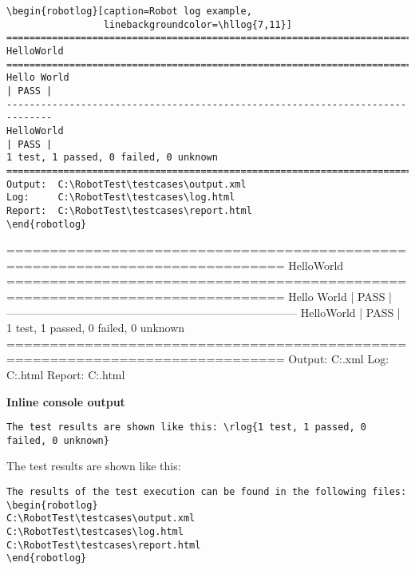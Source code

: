 \documentclass[a4paper,10pt]{report}
\begin{document}
\begin{verbatim}
\begin{robotlog}[caption=Robot log example, 
                 linebackgroundcolor=\hllog{7,11}]
==============================================================================
HelloWorld
==============================================================================
Hello World                                                           | PASS |
------------------------------------------------------------------------------
HelloWorld                                                            | PASS |
1 test, 1 passed, 0 failed, 0 unknown
==============================================================================
Output:  C:\RobotTest\testcases\output.xml
Log:     C:\RobotTest\testcases\log.html
Report:  C:\RobotTest\testcases\report.html
\end{robotlog}
\end{verbatim}

\begin{robotlog}[caption=Robot log example, 
                 linebackgroundcolor=\hllog{7,11}]
==============================================================================
HelloWorld
==============================================================================
Hello World                                                           | PASS |
------------------------------------------------------------------------------
HelloWorld                                                            | PASS |
1 test, 1 passed, 0 failed, 0 unknown
==============================================================================
Output:  C:\RobotTest\testcases\output.xml
Log:     C:\RobotTest\testcases\log.html
Report:  C:\RobotTest\testcases\report.html
\end{robotlog}

\vspace{2ex}

\textbf{Inline console output}
\begin{verbatim}
The test results are shown like this: \rlog{1 test, 1 passed, 0 failed, 0 unknown}
\end{verbatim}

The test results are shown like this: 

\vspace{2ex}

\begin{verbatim}
The results of the test execution can be found in the following files:
\begin{robotlog}
C:\RobotTest\testcases\output.xml
C:\RobotTest\testcases\log.html
C:\RobotTest\testcases\report.html
\end{robotlog}
\end{verbatim}
\end{document}
